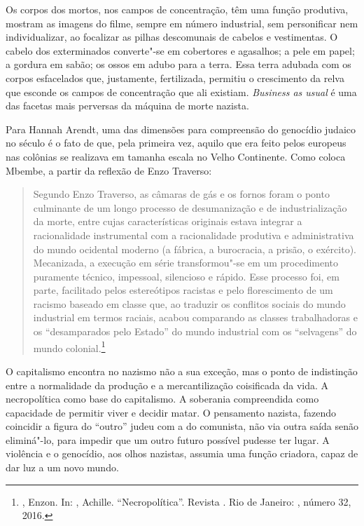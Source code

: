 Os corpos dos
mortos, nos campos de concentração, têm uma função produtiva, mostram as
imagens do filme, sempre em número industrial, sem personificar nem
individualizar, ao focalizar as pilhas descomunais de cabelos e
vestimentas. O cabelo dos exterminados converte"-se em cobertores e
agasalhos; a pele em papel; a gordura em sabão; os ossos em adubo para a
terra. Essa terra adubada com os corpos esfacelados que, justamente,
fertilizada, permitiu o crescimento da relva que esconde os campos de
concentração que ali existiam. \emph{Business as usual} é uma das
facetas mais perversas da máquina de morte nazista.

Para Hannah Arendt, uma das dimensões para compreensão do genocídio
judaico no século  é o fato de que, pela primeira vez, aquilo que era
feito pelos europeus nas colônias se realizava em tamanha escala no
Velho Continente. Como coloca Mbembe, a partir da reflexão de Enzo
Traverso:

\begin{quote}
Segundo Enzo Traverso, as câmaras de gás e os fornos foram o ponto
culminante de um longo processo de desumanização e de industrialização
da morte, entre cujas características originais estava integrar a
racionalidade instrumental com a racionalidade produtiva e
administrativa do mundo ocidental moderno (a fábrica, a burocracia, a
prisão, o exército). Mecanizada, a execução em série transformou"-se em
um procedimento puramente técnico, impessoal, silencioso e rápido. Esse
processo foi, em parte, facilitado pelos estereótipos racistas e pelo
florescimento de um racismo baseado em classe que, ao traduzir os
conflitos sociais do mundo industrial em termos raciais, acabou
comparando as classes trabalhadoras e os ``desamparados pelo Estado'' do
mundo industrial com os ``selvagens'' do mundo colonial.\footnote{, Enzon. In: ,
  Achille. ``Necropolítica''. Revista {}. Rio de Janeiro:
  , número 32, 2016.}
\end{quote}

O capitalismo encontra no nazismo não a sua exceção, mas o ponto de
indistinção entre a normalidade da produção e a mercantilização
coisificada da vida. A necropolítica como base do capitalismo. A
soberania compreendida como capacidade de permitir viver e decidir
matar. O pensamento nazista, fazendo coincidir a figura do ``outro''
judeu com a do comunista, não via outra saída senão eliminá"-lo, para
impedir que um outro futuro possível pudesse ter lugar. A violência e o
genocídio, aos olhos nazistas, assumia uma função criadora, capaz de dar
luz a um novo mundo.

